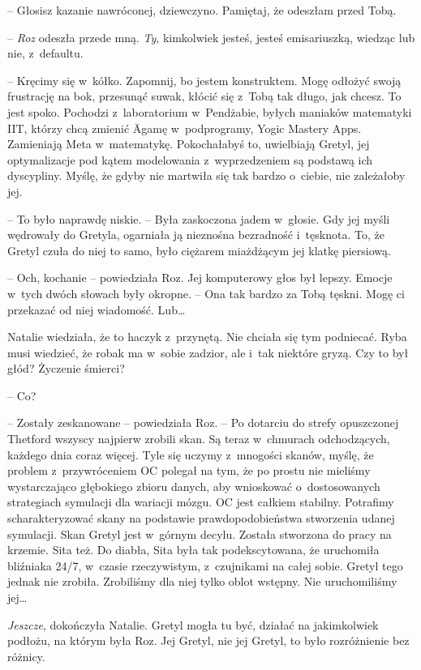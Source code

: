 \documentclass[oneside,polish,11pt,sfheadings]{mwbk}
\begin{document}
-- Głosisz kazanie nawróconej, dziewczyno. Pamiętaj, że odeszłam przed
Tobą.

-- \textit{Roz} odeszła przede mną. \textit{Ty}, kimkolwiek jesteś, jesteś
emisariuszką, wiedząc lub nie, z~defaultu.

-- Kręcimy się w~kółko. Zapomnij, bo jestem konstruktem. Mogę odłożyć
swoją frustrację na bok, przesunąć suwak, kłócić się z~Tobą tak długo,
jak chcesz. To jest spoko. Pochodzi z~laboratorium w~Pendżabie, byłych
maniaków matematyki IIT, którzy chcą zmienić Āgamę w~podprogramy, Yogic
Mastery Apps. Zamieniają Meta w~matematykę. Pokochałabyś to, uwielbiają
Gretyl, jej optymalizacje pod kątem modelowania z~wyprzedzeniem są
podstawą ich dyscypliny. Myślę, że gdyby nie martwiła się tak bardzo o~ciebie, nie zależałoby jej.

-- To było naprawdę niskie. -- Była zaskoczona jadem w~głosie. Gdy jej
myśli wędrowały do Gretyla, ogarniała ją nieznośna bezradność i~tęsknota. To, że Gretyl czuła do niej to samo, było ciężarem miażdżącym
jej klatkę piersiową.

-- Och, kochanie -- powiedziała Roz. Jej komputerowy głos był lepszy.
Emocje w~tych dwóch słowach były okropne. -- Ona tak bardzo za Tobą
tęskni. Mogę ci przekazać od niej wiadomość. Lub\ldots 

Natalie wiedziała, że to haczyk z~przynętą. Nie chciała się tym
podniecać. Ryba musi wiedzieć, że robak ma w~sobie zadzior, ale i~tak
niektóre gryzą. Czy to był głód? Życzenie śmierci? 

-- Co?

-- Zostały zeskanowane -- powiedziała Roz. -- Po dotarciu do strefy
opuszczonej Thetford wszyscy najpierw zrobili skan. Są teraz w~chmurach
odchodzących, każdego dnia coraz więcej. Tyle się uczymy z~mnogości
skanów, myślę, że problem z~przywróceniem OC polegał na tym, że po
prostu nie mieliśmy wystarczająco głębokiego zbioru danych, aby
wnioskować o~dostosowanych strategiach symulacji dla wariacji mózgu. OC
jest całkiem stabilny. Potrafimy scharakteryzować skany na podstawie
prawdopodobieństwa stworzenia udanej symulacji. Skan Gretyl jest w~górnym decylu. Została stworzona do pracy na krzemie. Sita też. Do
diabła, Sita była tak podekscytowana, że uruchomiła bliźniaka 24/7, w~czasie rzeczywistym, z~czujnikami na całej sobie. Gretyl tego jednak nie
zrobiła. Zrobiliśmy dla niej tylko oblot wstępny. Nie uruchomiliśmy
jej\ldots 

\textit{Jeszcze}, dokończyła Natalie. Gretyl mogła tu być, działać na
jakimkolwiek podłożu, na którym była Roz. Jej Gretyl, nie jej Gretyl, to
było rozróżnienie bez różnicy.
\end{document}
